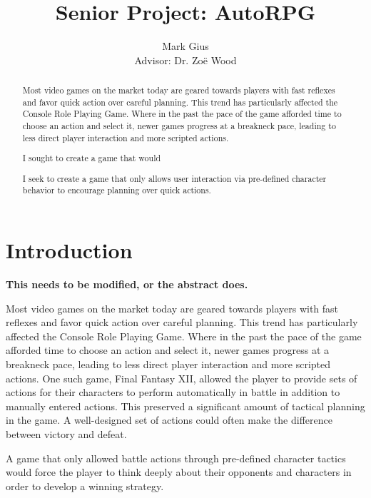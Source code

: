 \documentclass[11pt]{article}
\begin{document}
\author{Mark Gius\vspace{10pt} \\
        Advisor: Dr. Zo\"e Wood
        }
\title{Senior Project: AutoRPG}
\maketitle

\begin{abstract}
Most video games on the market today are geared towards players with fast reflexes and favor quick action over careful planning. This trend has particularly affected the Console Role Playing Game.  Where in the past the pace of the game afforded time to choose an action and select it, newer games progress at a breakneck pace, leading to less direct player interaction and more scripted actions.

I sought to create a game that would 

I seek to create a game that only allows user interaction via pre-defined character behavior to encourage planning over quick actions.
\end{abstract}

\doublespacing
\section{Introduction}

\textbf{This needs to be modified, or the abstract does.}

Most video games on the market today are geared towards players with fast reflexes and favor quick action over careful planning. This trend has particularly affected the Console Role Playing Game.  Where in the past the pace of the game afforded time to choose an action and select it, newer games progress at a breakneck pace, leading to less direct player interaction and more scripted actions.  One such game, Final Fantasy XII, allowed the player to provide sets of actions for their characters to perform automatically in battle in addition to manually entered actions. \cite{Gambits} This preserved a significant amount of tactical planning in the game. A well-designed set of actions could often make the difference between victory and defeat.

A game that only allowed battle actions through pre-defined character tactics would force the player to think deeply about their opponents and characters in order to develop a winning strategy. 
\end{document}
